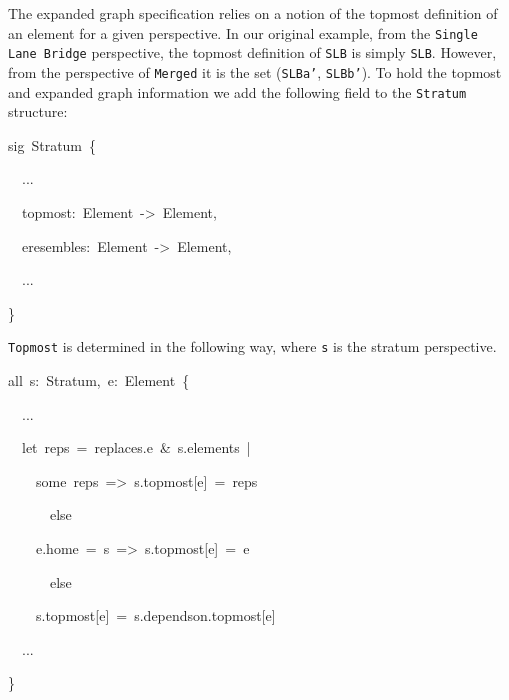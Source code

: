 The expanded graph specification relies on a notion of the topmost
definition of an element for a given perspective. In our original
example, from the \texttt{Single Lane Bridge} perspective, the topmost
definition of \texttt{SLB} is simply \texttt{SLB}. However, from the
perspective of \texttt{Merged} it is the set (\texttt{SLBa\textquoteright },
\texttt{SLBb\textquoteright }). To hold the topmost and expanded graph
information we add the following field to the \texttt{Stratum} structure:
\begin{lyxcode}
{\footnotesize{}sig~Stratum~\{}{\footnotesize \par}

{\footnotesize{}~~...}{\footnotesize \par}

{\footnotesize{}~~topmost:~Element~->~Element,}{\footnotesize \par}

{\footnotesize{}~~eresembles:~Element~->~Element,}{\footnotesize \par}

{\footnotesize{}~~...}{\footnotesize \par}

{\footnotesize{}\}}{\footnotesize \par}
\end{lyxcode}
\texttt{Topmost} is determined in the following way, where \texttt{s}
is the stratum perspective.
\begin{lyxcode}
{\footnotesize{}all~s:~Stratum,~e:~Element~\{}{\footnotesize \par}

{\footnotesize{}~~...}{\footnotesize \par}

{\footnotesize{}~~let~reps~=~replaces.e~\&~s.elements~|}{\footnotesize \par}

{\footnotesize{}~~~~some~reps~=>~s.topmost{[}e{]}~=~reps}{\footnotesize \par}

{\footnotesize{}~~~~~~else}{\footnotesize \par}

{\footnotesize{}~~~~e.home~=~s~=>~s.topmost{[}e{]}~=~e}{\footnotesize \par}

{\footnotesize{}~~~~~~else}{\footnotesize \par}

{\footnotesize{}~~~~s.topmost{[}e{]}~=~s.dependson.topmost{[}e{]}}{\footnotesize \par}

{\footnotesize{}~~...~}{\footnotesize \par}

{\footnotesize{}\}}{\footnotesize \par}
\end{lyxcode}
